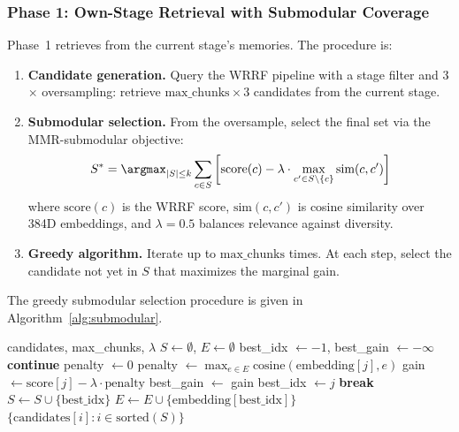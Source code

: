 \documentclass[11pt]{article}
\begin{document}
\subsubsection{Phase 1: Own-Stage Retrieval with Submodular Coverage}
\label{sec:phase1}

Phase~1 retrieves from the current stage's memories.  The procedure is:

\begin{enumerate}
  \item \textbf{Candidate generation.}  Query the WRRF pipeline with
    a stage filter and 3$\times$ oversampling: retrieve
    $\text{max\_chunks} \times 3$ candidates from the current stage.

  \item \textbf{Submodular selection.}  From the oversample, select
    the final set via the MMR-submodular objective:
    \begin{equation}
    S^* = \argmax_{|S| \leq k} \sum_{c \in S} \left[\text{score}(c) - \lambda \cdot \max_{c' \in S \setminus \{c\}} \text{sim}(c, c')\right]
    \label{eq:mmr}
    \end{equation}
    where $\text{score}(c)$ is the WRRF score,
    $\text{sim}(c, c')$ is cosine similarity over 384D embeddings,
    and $\lambda = 0.5$ balances relevance against diversity.

  \item \textbf{Greedy algorithm.}  Iterate up to
    $\text{max\_chunks}$ times.  At each step, select the candidate
    not yet in $S$ that maximizes the marginal gain.
\end{enumerate}

The greedy submodular selection procedure is given in
Algorithm~\ref{alg:submodular}.

\begin{algorithm}[t]
\caption{Submodular coverage selection (Phase~1)}
\label{alg:submodular}
\begin{algorithmic}[1]
\REQUIRE candidates, max\_chunks, $\lambda$
\STATE $S \leftarrow \emptyset$, $E \leftarrow \emptyset$ 
  \STATE best\_idx $\leftarrow -1$, best\_gain $\leftarrow -\infty$
      \STATE \textbf{continue}
    \ENDIF
      \STATE penalty $\leftarrow 0$
    \ELSE
      \STATE penalty $\leftarrow \max_{e \in E} \text{cosine}(\text{embedding}[j], e)$
    \ENDIF
    \STATE gain $\leftarrow \text{score}[j] - \lambda \cdot \text{penalty}$
      \STATE best\_gain $\leftarrow$ gain
      \STATE best\_idx $\leftarrow j$
    \ENDIF
  \ENDFOR
    \STATE \textbf{break}
  \ENDIF
  \STATE $S \leftarrow S \cup \{\text{best\_idx}\}$
    \STATE $E \leftarrow E \cup \{\text{embedding}[\text{best\_idx}]\}$
  \ENDIF
\ENDFOR
\RETURN $\{\text{candidates}[i] : i \in \text{sorted}(S)\}$
\end{algorithmic}
\end{algorithm}
\end{document}
